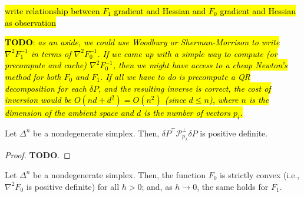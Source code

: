 \documentclass[eikonal.tex]{subfiles}
\begin{document}
\begin{corollary}
  \hl{write relationship between $F_1$ gradient and Hessian and $F_0$
    gradient and Hessian as observation}
\end{corollary}

\noindent \hl{\textbf{TODO}: \emph{as an aside, we could use Woodbury
    or Sherman-Morrison to write $\nabla^2 F_1^{-1}$ in terms of
    $\nabla^2 F_0^{-1}$. If we came up with a simple way to compute
    (or precompute and cache) $\nabla^2 F_0^{-1}$, then we might have
    access to a cheap Newton's method for both $F_0$ and $F_1$. If all
    we have to do is precompute a QR decomposition for each
    $\delta P$, and the resulting inverse is correct, the cost of
    inversion would be $O(nd + d^2) = O(n^2)$ (since $d \leq n$),
    where $n$ is the dimension of the ambient space and $d$ is the
    number of vectors $p_i$.}}

\begin{lemma}
  Let $\Delta^n$ be a nondegenerate simplex. Then,
  $\delta P^\top \mathcal{P}^\perp_{p_\lambda} \delta P$ is positive
  definite.
\end{lemma}

\begin{proof}
  \textbf{TODO}.
\end{proof}

\begin{lemma}
  Let $\Delta^n$ be a nondegenerate simplex. Then, the function $F_0$
  is strictly convex (i.e., $\nabla^2 F_0$ is positive definite) for
  all $h > 0$; and, as $h \to 0$, the same holds for $F_1$.
\end{lemma}
\end{document}
